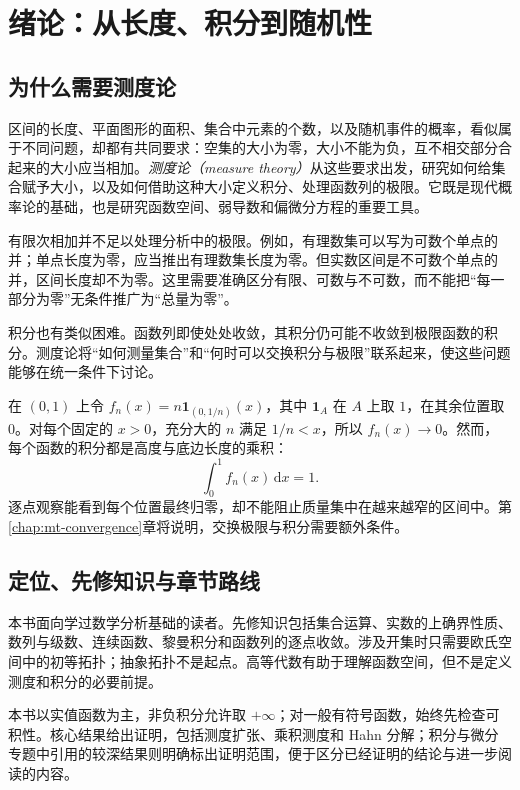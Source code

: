 \setcounter{chapter}{0} %
\chapter{绪论：从长度、积分到随机性}
\label{chap:mt-introduction}

\section{为什么需要测度论}
区间的长度、平面图形的面积、集合中元素的个数，以及随机事件的概率，看似属于不同问题，却都有共同要求：空集的大小为零，大小不能为负，互不相交部分合起来的大小应当相加。\emph{测度论（measure theory）}从这些要求出发，研究如何给集合赋予大小，以及如何借助这种大小定义积分、处理函数列的极限。它既是现代概率论的基础，也是研究函数空间、弱导数和偏微分方程的重要工具。

有限次相加并不足以处理分析中的极限。例如，有理数集可以写为可数个单点的并；单点长度为零，应当推出有理数集长度为零。但实数区间是不可数个单点的并，区间长度却不为零。这里需要准确区分有限、可数与不可数，而不能把“每一部分为零”无条件推广为“总量为零”。

积分也有类似困难。函数列即使处处收敛，其积分仍可能不收敛到极限函数的积分。测度论将“如何测量集合”和“何时可以交换积分与极限”联系起来，使这些问题能够在统一条件下讨论。

\begin{example}[移动到小区间上的质量]
在 $(0,1)$ 上令 $f_n(x)=n\mathbf1_{(0,1/n)}(x)$，其中 $\mathbf1_A$ 在 $A$ 上取 $1$，在其余位置取 $0$。对每个固定的 $x>0$，充分大的 $n$ 满足 $1/n<x$，所以 $f_n(x)\to0$。然而，每个函数的积分都是高度与底边长度的乘积：
\[
 \int_0^1 f_n(x)\,\mathrm dx=1.
\]
逐点观察能看到每个位置最终归零，却不能阻止质量集中在越来越窄的区间中。第\ref{chap:mt-convergence}章将说明，交换极限与积分需要额外条件。
\end{example}

\section{定位、先修知识与章节路线}
本书面向学过数学分析基础的读者。先修知识包括集合运算、实数的上确界性质、数列与级数、连续函数、黎曼积分和函数列的逐点收敛。涉及开集时只需要欧氏空间中的初等拓扑；抽象拓扑不是起点。高等代数有助于理解函数空间，但不是定义测度和积分的必要前提。

本书以实值函数为主，非负积分允许取 $+\infty$；对一般有符号函数，始终先检查可积性。核心结果给出证明，包括测度扩张、乘积测度和 Hahn 分解；积分与微分专题中引用的较深结果则明确标出证明范围，便于区分已经证明的结论与进一步阅读的内容。

